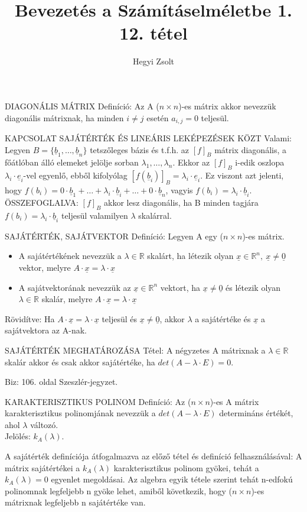 \documentclass[]{article}
\title{Bevezetés a Számításelméletbe 1.\\{\large 12. tétel}}
\author{Hegyi Zsolt}
\newcommand{\R}{\mathbb{R}}
\newcommand{\Und}[1]{\underline{#1}}
\begin{document}
\maketitle{}
\begin{shaded}
DIAGONÁLIS MÁTRIX Definíció: Az A ($n \times n$)-es mátrix akkor nevezzük diagonális mátrixnak, ha minden $i \neq j$ esetén $a_{i,j} = 0$ teljesül.
\end{shaded}
\begin{framed}
KAPCSOLAT SAJÁTÉRTÉK ÉS LINEÁRIS LEKÉPEZÉSEK KÖZT Valami:
Legyen $B = \{\Und{b}_1, \ldots, \Und{b}_n\}$ tetszőleges bázis és t.f.h. az $[f]_B$ mátrix diagonális, a főátlóban álló elemeket jelölje sorban $\lambda_1, \ldots, \lambda_n$. Ekkor az $[f]_B$ i-edik oszlopa $\lambda_i\cdot\Und{e}_i$-vel egyenlő, ebből kifolyólag $[f(\Und{b}_i)]_B = \lambda_i \cdot \Und{e}_i$. Ez viszont azt jelenti, hogy $f(b_i) = 0\cdot\Und{b}_1 + \ldots + \lambda_i \cdot \Und{b}_i + \ldots + 0 \cdot\Und{b}_n$, vagyis $f(b_i) = \lambda_i \cdot \Und{b}_i$.\\
ÖSSZEFOGLALVA: $[f]_B$ akkor lesz diagonális, ha B minden tagjára $f(b_i) = \lambda_i \cdot \Und{b}_i$ teljesül valamilyen $\lambda$ skalárral.
\end{framed}
\begin{shaded}
SAJÁTÉRTÉK, SAJÁTVEKTOR Definíció: Legyen A egy ($n \times n$)-es mátrix.
\begin{itemize}
\item A sajátértékének nevezzük a $\lambda \in \R$ skalárt, ha létezik olyan $\Und{x} \in \R^n,\: \Und{x} \neq \Und{0}$ vektor, melyre $A \cdot \Und{x} = \lambda\cdot \Und{x}$
\item A sajátvektorának nevezzük az $\Und{x} \in \R^n$ vektort, ha $\Und{x} \neq \Und{0}$ és létezik olyan $\lambda \in \R$ skalár, melyre $A \cdot \Und{x} = \lambda\cdot \Und{x}$
\end{itemize}
Rövidítve: Ha $A\cdot\Und{x} = \lambda\cdot\Und{x}$ teljesül és $\Und{x} \neq \Und{0}$, akkor $\lambda$ a sajátértéke és $\Und{x}$ a sajátvektora az A-nak.
\end{shaded}
\begin{framed}
SAJÁTÉRTÉK MEGHATÁROZÁSA Tétel: A négyzetes A mátrixnak a $\lambda \in \R$ skalár akkor és csak akkor sajátértéke, ha $det(A - \lambda\cdot E) = 0$.
\end{framed}
\begin{leftbar}
Biz: 106. oldal Szeszlér-jegyzet.
\end{leftbar}
\begin{shaded}
KARAKTERISZTIKUS POLINOM Definíció: Az ($n \times n$)-es A mátrix karakterisztikus polinomjának nevezzük a $det(A - \lambda\cdot E)$ determináns értékét, ahol $\lambda$ változó.\\
Jelölés: $k_A(\lambda)$.
\end{shaded}
A sajátérték definíciója átfogalmazva az előző tétel és definíció felhasználásával: A mátrix sajátértékei a $k_A(\lambda)$ karakterisztikus polinom gyökei, tehát a $k_A(\lambda) = 0$ egyenlet megoldásai. Az algebra egyik tétele szerint tehát n-edfokú polinomnak legfeljebb n gyöke lehet, amiből következik, hogy ($n \times n$)-es mátrixnak legfeljebb n sajátértéke van.
\end{document}
